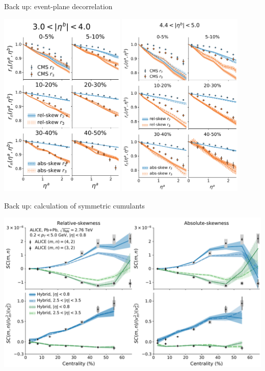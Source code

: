\documentclass[11pt]{beamer}
\begin{document}
\begin{frame}[noframenumbering]{Back up: event-plane decorrelation}
\begin{center}
\includegraphics[width=0.45\textwidth]{evt_pln_decorr_near.pdf}
\quad\quad
\includegraphics[width=0.45\textwidth]{evt_pln_decorr_far.pdf}
\end{center}
\end{frame}

\begin{frame}[noframenumbering]{Back up: calculation of symmetric cumulants}
\begin{center}
\includegraphics[width=\textwidth]{smn.pdf}
\end{center}
\end{frame}
\end{document}
